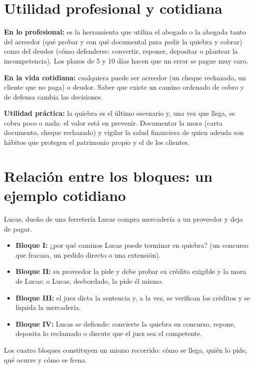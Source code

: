 \documentclass[12pt,oneside]{book}
\begin{document}
\section*{Utilidad profesional y cotidiana}

\textbf{En lo profesional:} es la herramienta que utiliza el abogado o la abogada tanto del acreedor (qué probar y con qué documental para pedir la quiebra y cobrar) como del deudor (cómo defenderse: convertir, reponer, depositar o plantear la incompetencia). Los plazos de 5 y 10 días hacen que un error se pague muy caro.

\textbf{En la vida cotidiana:} cualquiera puede ser acreedor (un cheque rechazado, un cliente que no paga) o deudor. Saber que existe un camino ordenado de cobro y de defensa cambia las decisiones.

\textbf{Utilidad práctica:} la quiebra es el último escenario y, una vez que llega, se cobra poco o nada: el valor está en prevenir. Documentar la mora (carta documento, cheque rechazado) y vigilar la salud financiera de quien adeuda son hábitos que protegen el patrimonio propio y el de los clientes.

\section*{Relación entre los bloques: un ejemplo cotidiano}

\begin{example}{Lucas, dueño de una ferretería}
Lucas compra mercadería a un proveedor y deja de pagar.
\begin{itemize}
    \item \textbf{Bloque I:} ¿por qué caminos Lucas puede terminar en quiebra? (un concurso que fracasa, un pedido directo o una extensión).
    \item \textbf{Bloque II:} su proveedor la pide y debe probar su crédito exigible y la mora de Lucas; o Lucas, desbordado, la pide él mismo.
    \item \textbf{Bloque III:} el juez dicta la sentencia y, a la vez, se verifican los créditos y se liquida la mercadería.
    \item \textbf{Bloque IV:} Lucas se defiende: convierte la quiebra en concurso, repone, deposita lo reclamado o discute que el juez sea el competente.
\end{itemize}
Los cuatro bloques constituyen un mismo recorrido: cómo se llega, quién lo pide, qué ocurre y cómo se frena.
\end{example}
\end{document}
